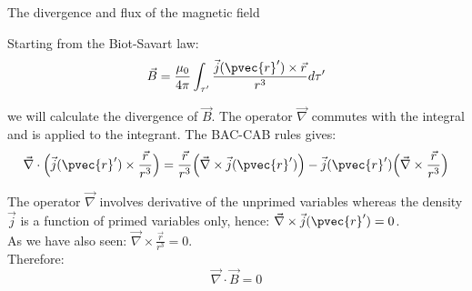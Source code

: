 %
%
%

\begin{frame}{The divergence and flux of the magnetic field}

Starting from the Biot-Savart law:
\begin{equation*}
        \vec{B} =
          \frac{\mu_0}{4\pi} \int_{\tau^{\prime}}
             \frac{\vec{j}(\pvec{r}') \times \vec{r}}{r^{3}} d\tau^{\prime}
\end{equation*}

we will calculate the divergence of $\vec{B}$.
The operator $\vec{\nabla}$ commutes with the integral and is applied to the integrant.
The BAC-CAB rules gives:
\begin{equation*}
         \vec{\nabla} \cdot \Big( \vec{j}(\pvec{r}') \times \frac{\vec{r}}{r^{3}} \Big) =
         \frac{\vec{r}}{r^{3}} \Big( \vec{\nabla} \times \vec{j}(\pvec{r}') \Big) -
         \vec{j}(\pvec{r}') \Big( \vec{\nabla} \times \frac{\vec{r}}{r^{3}} \Big)
\end{equation*}

The operator $\vec{\nabla}$ involves derivative of the unprimed variables
whereas the density $\vec{j}$ is a function of primed variables only, hence:
$\vec{\nabla} \times \vec{j}(\pvec{r}') = 0$.\\
\vspace{0.1cm}
As we have also seen:
$\vec{\nabla} \times \frac{\vec{r}}{r^{3}} = 0$.\\
\vspace{0.1cm}
Therefore:
\begin{equation*}
         \vec{\nabla} \cdot \vec{B} =  0
\end{equation*}

\end{frame}

%
%
%


